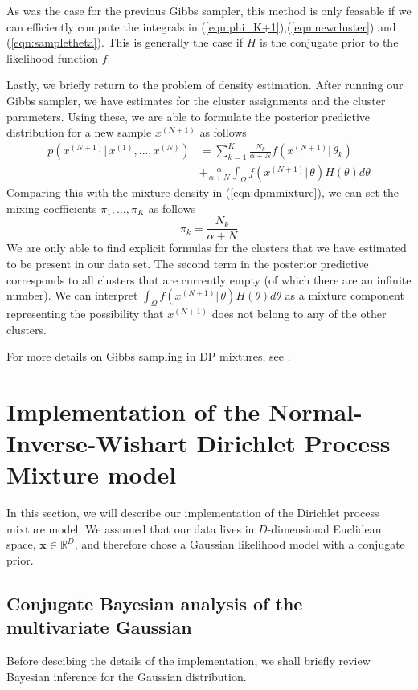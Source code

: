 \documentclass[final,3p,times,twocolumn]{elsarticle}
\let\bs\boldsymbol
\begin{document}
As was the case for the previous Gibbs sampler, this method is only feasable if we can efficiently compute the integrals in (\ref{eqn:phi_K+1}),(\ref{eqn:newcluster}) and (\ref{eqn:sampletheta}).
This is generally the case if $H$ is the conjugate prior to the likelihood function $f$.

Lastly, we briefly return to the problem of density estimation.
After running our Gibbs sampler, we have estimates for the cluster assignments and the cluster parameters.
Using these, we are able to formulate the posterior predictive distribution for a new sample $x^{(N+1)}$ as follows
\begin{equation}
\label{eqn:dompostpred}
\begin{split}
p(x^{(N+1)}|\,x^{(1)},\dots,x^{(N)}) &= \sum_{k=1}^K \frac{N_k}{\alpha+N}f(x^{(N+1)}|\,\bar\theta_k)\\
&+ \frac{\alpha}{\alpha+N}\int_\Omega f(x^{(N+1)}|\,\theta)H(\theta)d\theta
\end{split}
\end{equation}
Comparing this with the mixture density in (\ref{eqn:dpmmixture}), we can set the mixing coefficients $\pi_1,\dots,\pi_K$ as follows
\begin{equation}
\pi_k = \frac{N_k}{\alpha+N}
\end{equation}
We are only able to find explicit formulas for the clusters that we have estimated to be present in our data set.
The second term in the posterior predictive corresponds to all clusters that are currently empty (of which there are an infinite number).
We can interpret $\int_\Omega f(x^{(N+1)}|\,\theta)H(\theta)d\theta$ as a mixture component representing the possibility that $x^{(N+1)}$ does not belong to any of the other clusters. 

For more details on Gibbs sampling in DP mixtures, see \cite{neal2000,orbanz2014}.


\section{Implementation of the Normal-Inverse-Wishart Dirichlet Process Mixture model}
\label{sect:implementation}
In this section, we will describe our implementation of the Dirichlet process mixture model.
We assumed that our data lives in $D$-dimensional Euclidean space, $\bs x \in \mathbb{R}^D$, and therefore chose a Gaussian likelihood model with a conjugate prior.

\subsection{Conjugate Bayesian analysis of the multivariate Gaussian}
Before descibing the details of the implementation, we shall briefly review Bayesian inference for the Gaussian distribution.
\end{document}

